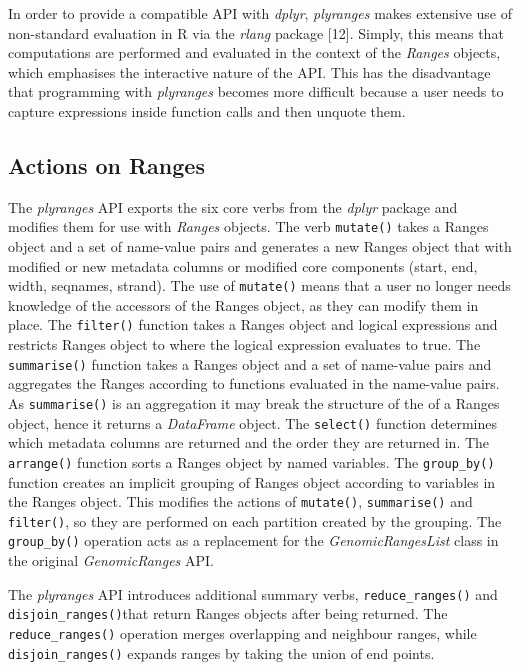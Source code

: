 \documentclass[10pt,letterpaper]{article}
\begin{document}
In order to provide a compatible API with \emph{dplyr}, \emph{plyranges}
makes extensive use of non-standard evaluation in R via the \emph{rlang}
package {[}12{]}. Simply, this means that computations are performed and
evaluated in the context of the \emph{Ranges} objects, which emphasises
the interactive nature of the API. This has the disadvantage that
programming with \emph{plyranges} becomes more difficult because a user
needs to capture expressions inside function calls and then unquote
them.

\subsection{Actions on Ranges}\label{actions-on-ranges}

The \emph{plyranges} API exports the six core verbs from the
\emph{dplyr} package and modifies them for use with \emph{Ranges}
objects. The verb \texttt{mutate()} takes a Ranges object and a set of
name-value pairs and generates a new Ranges object that with modified or
new metadata columns or modified core components (start, end, width,
seqnames, strand). The use of \texttt{mutate()} means that a user no
longer needs knowledge of the accessors of the Ranges object, as they
can modify them in place. The \texttt{filter()} function takes a Ranges
object and logical expressions and restricts Ranges object to where the
logical expression evaluates to true. The \texttt{summarise()} function
takes a Ranges object and a set of name-value pairs and aggregates the
Ranges according to functions evaluated in the name-value pairs. As
\texttt{summarise()} is an aggregation it may break the structure of the
of a Ranges object, hence it returns a \emph{DataFrame} object. The
\texttt{select()} function determines which metadata columns are
returned and the order they are returned in. The \texttt{arrange()}
function sorts a Ranges object by named variables. The
\texttt{group\_by()} function creates an implicit grouping of Ranges
object according to variables in the Ranges object. This modifies the
actions of \texttt{mutate()}, \texttt{summarise()} and
\texttt{filter()}, so they are performed on each partition created by
the grouping. The \texttt{group\_by()} operation acts as a replacement
for the \emph{GenomicRangesList} class in the original
\emph{GenomicRanges} API.

The \emph{plyranges} API introduces additional summary verbs,
\texttt{reduce\_ranges()} and \texttt{disjoin\_ranges()}that return
Ranges objects after being returned. The \texttt{reduce\_ranges()}
operation merges overlapping and neighbour ranges, while
\texttt{disjoin\_ranges()} expands ranges by taking the union of end
points.
\end{document}
